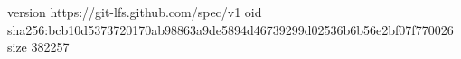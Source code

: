 version https://git-lfs.github.com/spec/v1
oid sha256:bcb10d5373720170ab98863a9de5894d46739299d02536b6b56e2bf07f770026
size 382257
